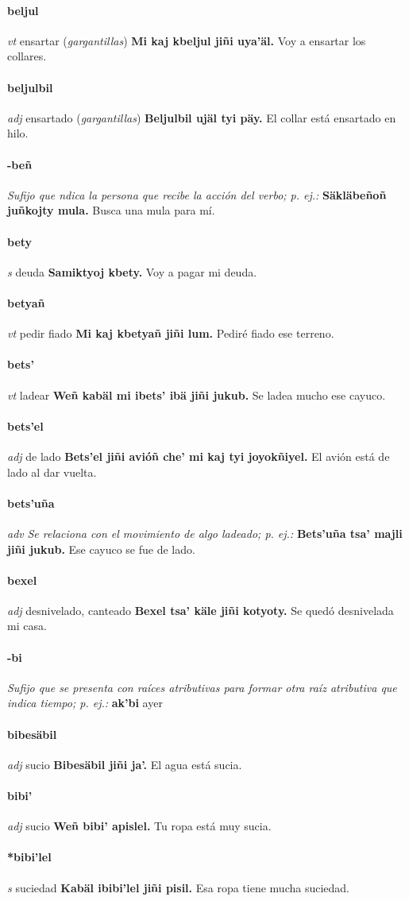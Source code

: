 \documentclass{scrbook}
\newcommand{\entry}[1]{\paragraph{#1}}
\newcommand{\nontranslationdef}[1]{\textit{#1}}
\newcommand{\partofspeech}[1]{\textit{#1}}
\newcommand{\spanishtranslation}[1]{#1}
\newcommand{\clarification}[1]{(\textit{#1})}
\newcommand{\cholexample}[1]{\textbf{#1}}
\newcommand{\exampletranslation}[1]{#1}
\begin{document}
\begin{multicols}{2}
\entry{beljul}
\partofspeech{vt}
\spanishtranslation{ensartar}
\clarification{gargantillas}
\cholexample{Mi kaj kbeljul jiñi uya'äl.}
\exampletranslation{Voy a ensartar los collares.}

\entry{beljulbil}
\partofspeech{adj}
\spanishtranslation{ensartado}
\clarification{gargantillas}
\cholexample{Beljulbil ujäl tyi päy.}
\exampletranslation{El collar está ensartado en hilo.}

\entry{-beñ}
\nontranslationdef{Sufijo que ndica la persona que recibe la acción del verbo; p. ej.:}
\cholexample{Säkläbeñoñ juñkojty mula.}
\exampletranslation{Busca una mula para mí.}

\entry{bety}
\partofspeech{s}
\spanishtranslation{deuda}
\cholexample{Samiktyoj kbety.}
\exampletranslation{Voy a pagar mi deuda.}

\entry{betyañ}
\partofspeech{vt}
\spanishtranslation{pedir fiado}
\cholexample{Mi kaj kbetyañ jiñi lum.}
\exampletranslation{Pediré fiado ese terreno.}

\entry{bets'}
\partofspeech{vt}
\spanishtranslation{ladear}
\cholexample{Weñ kabäl mi ibets' ibä jiñi jukub.}
\exampletranslation{Se ladea mucho ese cayuco.}

\entry{bets'el}
\partofspeech{adj}
\spanishtranslation{de lado}
\cholexample{Bets'el jiñi avióñ che' mi kaj tyi joyokñiyel.}
\exampletranslation{El avión está de lado al dar vuelta.}

\entry{bets'uña}
\partofspeech{adv}
\nontranslationdef{Se relaciona con el movimiento de algo ladeado; p. ej.:}
\cholexample{Bets'uña tsa' majli jiñi jukub.}
\exampletranslation{Ese cayuco se fue de lado.}

\entry{bexel}
\partofspeech{adj}
\spanishtranslation{desnivelado, canteado}
\cholexample{Bexel tsa' käle jiñi kotyoty.}
\exampletranslation{Se quedó desnivelada mi casa.}

\entry{-bi}
\nontranslationdef{Sufijo que se presenta con raíces atributivas para formar otra raíz atributiva que indica tiempo; p. ej.:}
\cholexample{ak'bi}
\exampletranslation{ayer}

\entry{bibesäbil}
\partofspeech{adj}
\spanishtranslation{sucio}
\cholexample{Bibesäbil jiñi ja'.}
\exampletranslation{El agua está sucia.}

\entry{bibi'}
\partofspeech{adj}
\spanishtranslation{sucio}
\cholexample{Weñ bibi' apislel.}
\exampletranslation{Tu ropa está muy sucia.}

\entry{*bibi'lel}
\partofspeech{s}
\spanishtranslation{suciedad}
\cholexample{Kabäl ibibi'lel jiñi pisil.}
\exampletranslation{Esa ropa tiene mucha suciedad.}


\end{multicols}
\end{document}
